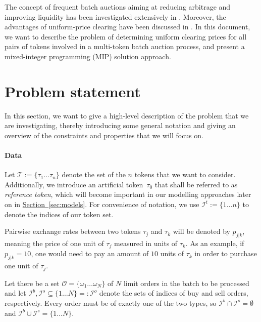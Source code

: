 \documentclass[11pt,parskip=full]{scrartcl}%
\newcommand*{\tokens}{\mathcal{T}}          %
\newcommand*{\orders}{\mathcal{O}}          %
\newcommand*{\iorders}{\mathcal{I}^o}       %
\newcommand*{\ibuyorders}{\mathcal{I}^b}    %
\newcommand*{\isellorders}{\mathcal{I}^s}   %
\newcommand*{\secref}[1]{\hyperref[{#1}]{Section~\ref*{#1}}}
\begin{document}
The concept of frequent batch auctions aiming at reducing arbitrage and improving liquidity has
been investigated extensively in \cite{budish:HFT}.
Moreover, the advantages of uniform-price clearing have been discussed in 
\cite{engelbrecht:multi_unit_auctions}.
In this document, we want to describe the problem of determining uniform clearing prices for all
pairs of tokens involved in a multi-token batch auction process, and present a mixed-integer
programming (MIP) solution approach.


\clearpage
\section{Problem statement}
\label{sec:problem}

In this section, we want to give a high-level description of the problem that we are investigating,
thereby introducing some general notation and giving an overview of the constraints and properties
that we will focus on.

\vspace{-.3cm}
\paragraph{Data}

Let $ \tokens := \{ \tau_1 \ldots \tau_n \} $ denote the set of the $ n $ tokens that we want to
consider.
Additionally, we introduce an artificial token~$ \tau_0 $ that shall be referred to as 
\emph{reference token}, which will become important in our modelling approaches later on in 
\secref{sec:models}.
For convenience of notation, we use $ \mathcal{I}^t := \{ 1 \ldots n \} $ to denote the indices
of our token set.

Pairwise exchange rates between two tokens $ \tau_j $ and $ \tau_k $ will be denoted by
$ p_{j|k} $, meaning the price of one unit of $ \tau_j $ measured in units of $ \tau_k $.
As an example, if $ p_{j|k} = 10 $, one would need to pay an amount of $ 10 $ units of $ \tau_k $
in order to purchase one unit of $ \tau_j $.

Let there be a set $ \orders = \{ \omega_1 \ldots \omega_N \} $ of $ N $ limit orders in the batch
to be processed and let $ \ibuyorders, \isellorders \subseteq \{ 1 \ldots N \} =: \iorders $ denote
the sets of indices of buy and sell orders, respectively.
Every order must be of exactly one of the two types, so $ \ibuyorders \cap \isellorders =
\emptyset $ and $ \ibuyorders \cup \isellorders = \{ 1 \ldots N \} $.
\end{document}
